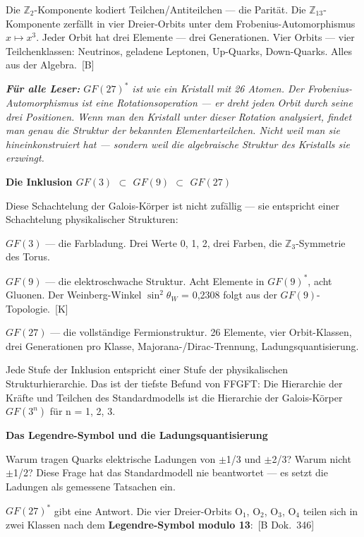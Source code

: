 \documentclass[11pt,oneside]{book}
\newcommand{\status}[1]{\penalty10000\,{\scriptsize\textcolor{gray!60}{[#1]}}}
\newenvironment{laierspur}{%
  \par\vspace{4pt}%
  \noindent\small\itshape\color{blue!60!black}%
  \textbf{Für alle Leser:}\enspace\ignorespaces}{%
  \par\vspace{4pt}\normalsize\normalfont\normalcolor}
\begin{document}
Die $\mathbb{Z}_2$-Komponente kodiert Teilchen/Antiteilchen — die Parität.
Die $\mathbb{Z}_{13}$-Komponente zerfällt in vier Dreier-Orbits unter dem
Frobenius-Automorphismus $x \mapsto x^3$. Jeder Orbit hat drei Elemente —
drei Generationen. Vier Orbits — vier Teilchenklassen: Neutrinos,
geladene Leptonen, Up-Quarks, Down-Quarks. Alles aus der Algebra. \status{B}


\begin{laierspur}
$GF(27)^*$ ist wie ein Kristall mit 26 Atomen. Der Frobenius-
Automorphismus ist eine Rotationsoperation — er dreht jeden Orbit durch
seine drei Positionen. Wenn man den Kristall unter dieser Rotation
analysiert, findet man genau die Struktur der bekannten Elementarteilchen.
Nicht weil man sie hineinkonstruiert hat — sondern weil die algebraische
Struktur des Kristalls sie erzwingt.
\end{laierspur}

\textbf{Die Inklusion $GF(3)$ $\subset$ $GF(9)$ $\subset$ $GF(27)$}


Diese Schachtelung der Galois-Körper ist nicht zufällig — sie entspricht
einer Schachtelung physikalischer Strukturen:


$GF(3)$ — die Farbladung. Drei Werte {0, 1, 2}, drei Farben, die $\mathbb{Z}_3$-Symmetrie
des Torus.


$GF(9)$ — die elektroschwache Struktur. Acht Elemente in $GF(9)^*$, acht Gluonen.
Der Weinberg-Winkel $\sin^2\theta_W$ = 0,2308 folgt aus der $GF(9)$-Topologie. \status{K}


$GF(27)$ — die vollständige Fermionstruktur. 26 Elemente, vier Orbit-Klassen,
drei Generationen pro Klasse, Majorana-/Dirac-Trennung, Ladungsquantisierung.


Jede Stufe der Inklusion entspricht einer Stufe der physikalischen
Strukturhierarchie. Das ist der tiefste Befund von FFGFT: Die Hierarchie
der Kräfte und Teilchen des Standardmodells ist die Hierarchie der
Galois-Körper $GF(3^n)$ für n = 1, 2, 3.


\textbf{Das Legendre-Symbol und die Ladungsquantisierung}


Warum tragen Quarks elektrische Ladungen von $\pm$1/3 und $\pm$2/3? Warum nicht
$\pm$1/2? Diese Frage hat das Standardmodell nie beantwortet — es setzt die
Ladungen als gemessene Tatsachen ein.


$GF(27)^*$ gibt eine Antwort. Die vier Dreier-Orbits O$_1$, O$_2$, O$_3$, O$_4$ teilen
sich in zwei Klassen nach dem \textbf{Legendre-Symbol modulo 13}: \status{B Dok.~346}
\end{document}
